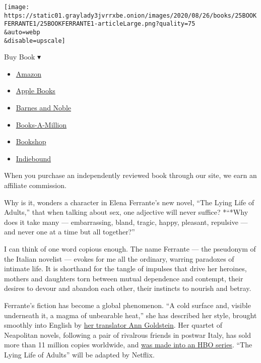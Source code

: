 \texttt{[image: https://static01.graylady3jvrrxbe.onion/images/2020/08/26/books/25BOOKFERRANTE1/25BOOKFERRANTE1-articleLarge.png?quality=75\\\&auto=webp\\\&disable=upscale]}

Buy Book ▾

\begin{itemize}
\tightlist
\item
  \href{https://www.amazon.com/gp/search?index=books\&tag=NYTBSREV-20\&field-keywords=The+Lying+Life+of+Adults+Elena+Ferrante}{Amazon}
\item
  \href{https://du-gae-books-dot-nyt-du-prd.appspot.com/buy?title=The+Lying+Life+of+Adults\&author=Elena+Ferrante}{Apple
  Books}
\item
  \href{https://www.anrdoezrs.net/click-7990613-11819508?url=https\%3A\%2F\%2Fwww.barnesandnoble.com\%2Fw\%2F\%3Fean\%3D9781609455910}{Barnes
  and Noble}
\item
  \href{https://www.anrdoezrs.net/click-7990613-35140?url=https\%3A\%2F\%2Fwww.booksamillion.com\%2Fp\%2FThe\%2BLying\%2BLife\%2Bof\%2BAdults\%2FElena\%2BFerrante\%2F9781609455910}{Books-A-Million}
\item
  \href{https://bookshop.org/a/3546/9781609455910}{Bookshop}
\item
  \href{https://www.indiebound.org/book/9781609455910?aff=NYT}{Indiebound}
\end{itemize}

When you purchase an independently reviewed book through our site, we
earn an affiliate commission.

Why is it, wonders a character in Elena Ferrante's new novel, ``The
Lying Life of Adults,'' that when talking about sex, one adjective will
never suffice? *``*Why does it take many --- embarrassing, bland,
tragic, happy, pleasant, repulsive --- and never one at a time but all
together?''

I can think of one word copious enough. The name Ferrante --- the
pseudonym of the Italian novelist --- evokes for me all the ordinary,
warring paradoxes of intimate life. It is shorthand for the tangle of
impulses that drive her heroines, mothers and daughters torn between
mutual dependence and contempt, their desires to devour and abandon each
other, their instincts to nourish and betray.

Ferrante's fiction has become a global phenomenon. ``A cold surface and,
visible underneath it, a magma of unbearable heat,'' she has described
her style, brought smoothly into English by
\href{https://www.nytimes3xbfgragh.onion/2020/08/21/books/elena-ferrante-lying-life-of-adults-ann-goldstein-translator.html}{her
translator Ann Goldstein}. Her quartet of Neapolitan novels, following a
pair of rivalrous friends in postwar Italy, has sold more than 11
million copies worldwide, and
\href{https://www.nytimes3xbfgragh.onion/2018/11/14/arts/television/my-brilliant-friend-review-hbo.html}{was
made into an HBO series}. ``The Lying Life of Adults'' will be adapted
by Netflix.

